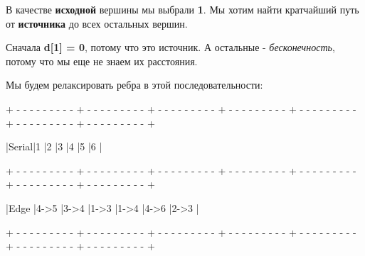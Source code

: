 В качестве \textbf{исходной} вершины мы выбрали \textbf{1}. Мы хотим найти кратчайший путь от \textbf{источника} до всех остальных вершин.

\vspace{\baselineskip}

Сначала \textbf{d[1] = 0}, потому что это источник. А остальные - \textit{бесконечность}, потому что мы еще не знаем их расстояния.

\vspace{\baselineskip}

Мы будем релаксировать ребра в этой последовательности:

\vspace{\baselineskip}

\begin{tcolorbox}
{\tiny{+ - - - - - - - - - + - - - - - - - - - + - - - - - - - - - + - - - - - - - - - + - - - - - - - - - + - - - - - - - - - + - - - - - - - - - +}}

\hspace{0.4mm}|\hspace{3.7mm}Serial\hspace{3.6mm}|\hspace{7.1mm}1\hspace{7.1mm} |\hspace{7.1mm}2\hspace{7.1mm} |\hspace{7.1mm}3\hspace{6.8mm} |\hspace{7.1mm}4\hspace{7.1mm} |\hspace{7.1mm}5\hspace{6.8mm} |\hspace{6.8mm}6\hspace{7.3mm} |

{\tiny{+ - - - - - - - - - + - - - - - - - - - + - - - - - - - - - + - - - - - - - - - + - - - - - - - - - + - - - - - - - - - + - - - - - - - - - +}}

\hspace{0.4mm}|\hspace{3.5mm}Edge\hspace{3.5mm}
|\hspace{3.7mm}4->5\hspace{3.7mm} |\hspace{3.7mm}3->4\hspace{3.7mm} |\hspace{3.7mm}1->3\hspace{3.7mm} |\hspace{3.7mm}1->4\hspace{3.7mm} |\hspace{3.7mm}4->6\hspace{3.7mm} |\hspace{3.7mm}2->3\hspace{3.7mm} |

{\tiny{+ - - - - - - - - - + - - - - - - - - - + - - - - - - - - - + - - - - - - - - - + - - - - - - - - - + - - - - - - - - - + - - - - - - - - - +}}
\end{tcolorbox}

